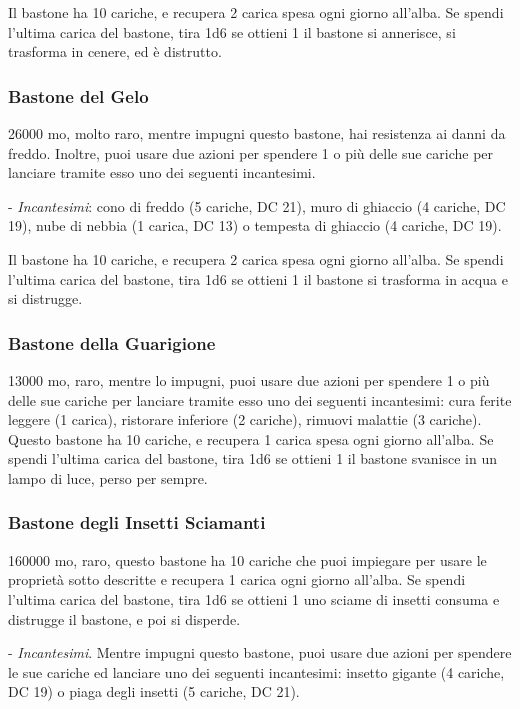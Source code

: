 \begin{multicols}{2}
	Il bastone ha 10 cariche, e recupera 2 carica spesa ogni giorno all'alba. Se spendi l'ultima carica del bastone, tira 1d6 se ottieni 1 il bastone si annerisce, si trasforma in cenere, ed è distrutto.

	\subsubsection*{Bastone del Gelo}
	26000 mo, molto raro, mentre impugni questo bastone, hai resistenza ai danni da freddo.
	Inoltre, puoi usare due azioni per spendere 1 o più delle sue cariche per lanciare tramite esso uno dei seguenti incantesimi.

	- \textit{Incantesimi}: cono di freddo (5 cariche, DC 21), muro di ghiaccio (4 cariche, DC 19), nube di nebbia (1 carica, DC 13) o tempesta di ghiaccio (4 cariche, DC 19).

	Il bastone ha 10 cariche, e recupera 2 carica spesa ogni giorno all'alba. Se spendi l'ultima carica del bastone, tira 1d6 se ottieni 1 il bastone si trasforma in acqua e si distrugge.

	\subsubsection*{Bastone della Guarigione}
	13000 mo, raro, mentre lo impugni, puoi usare due azioni per spendere 1 o più delle sue cariche per lanciare tramite esso uno dei seguenti incantesimi: cura ferite leggere (1 carica), ristorare inferiore (2 cariche), rimuovi malattie (3 cariche). Questo bastone ha 10 cariche, e recupera 1 carica spesa ogni giorno all'alba. Se spendi l'ultima carica del bastone, tira 1d6 se ottieni 1 il bastone svanisce in un lampo di luce, perso per sempre.

	\subsubsection*{Bastone degli Insetti Sciamanti}
	160000 mo, raro, questo bastone ha 10 cariche che puoi impiegare per usare le proprietà sotto descritte e recupera 1 carica ogni giorno all'alba. Se spendi l'ultima carica del bastone, tira 1d6 se ottieni 1 uno sciame di insetti consuma e distrugge il bastone, e poi si disperde.

	- \textit{Incantesimi}. Mentre impugni questo bastone, puoi usare due azioni per spendere le sue cariche ed lanciare uno dei seguenti incantesimi: insetto gigante (4 cariche, DC 19) o piaga degli insetti (5 cariche, DC 21).


\end{multicols}
